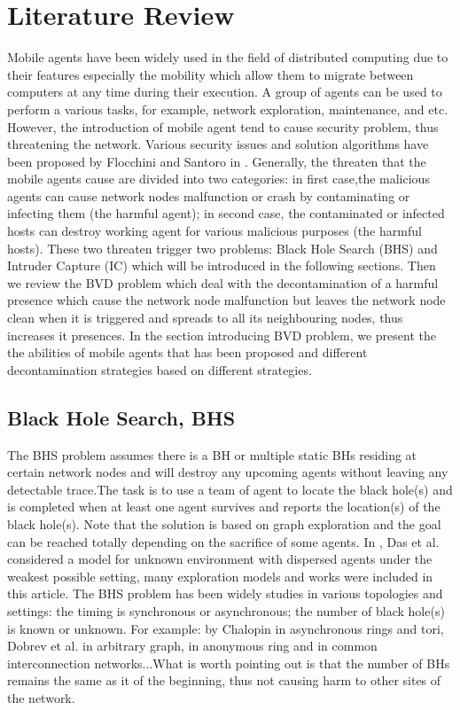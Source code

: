 \chapter {Literature Review}
\label{RW}
Mobile agents have been widely used in the field of distributed computing due to their features especially the mobility which allow them to migrate between computers at any time during their execution. A group of agents can be used to perform a various tasks, for example, network exploration, maintenance, and etc. However, the introduction of mobile agent tend to cause security problem, thus threatening the network. Various security issues and solution algorithms have been proposed by Flocchini and Santoro in \cite{security}. Generally, the threaten that the mobile agents cause are divided into two categories: in first case,the malicious agents can cause network nodes malfunction or crash by contaminating or infecting them (the harmful agent); in second case, the contaminated or infected hosts can destroy working agent for various malicious purposes (the harmful hosts). These two threaten trigger two problems: Black Hole Search (BHS) and Intruder Capture (IC) which will be introduced in the following sections. Then we review the BVD problem which deal with the decontamination of a harmful presence which cause the network node malfunction but leaves the network node clean when it is triggered and spreads to all its neighbouring nodes, thus increases it presences. In the section introducing BVD problem, we present the the abilities of mobile agents that has been proposed and different decontamination strategies based on different strategies.

\section{Black Hole Search, BHS}
The BHS problem assumes there is a BH or multiple static BHs residing at certain network nodes and will destroy any upcoming agents without leaving any detectable trace.The task is to use a team of agent to locate the black hole(s) and is completed when at least one agent survives and reports the location(s) of the black hole(s). Note that the solution is based on graph exploration and the goal can be reached totally depending on the sacrifice of some agents. In \cite{Das}, Das et al. considered a model for unknown environment with dispersed agents under the weakest possible setting, many exploration models and works were included in this article. The BHS problem has been widely studies in various topologies and settings: the timing is synchronous or asynchronous; the number of black hole(s) is known or unknown. For example: by Chalopin \cite{Das1,Das2} in asynchronous rings and tori, Dobrev et al. \cite{ Dobr} in arbitrary graph, \cite{Dobr1} in anonymous ring and \cite{Dobr2} in common interconnection networks...What is worth pointing out is that the number of BHs remains the same as it of the beginning, thus not causing harm to other sites of the network.


